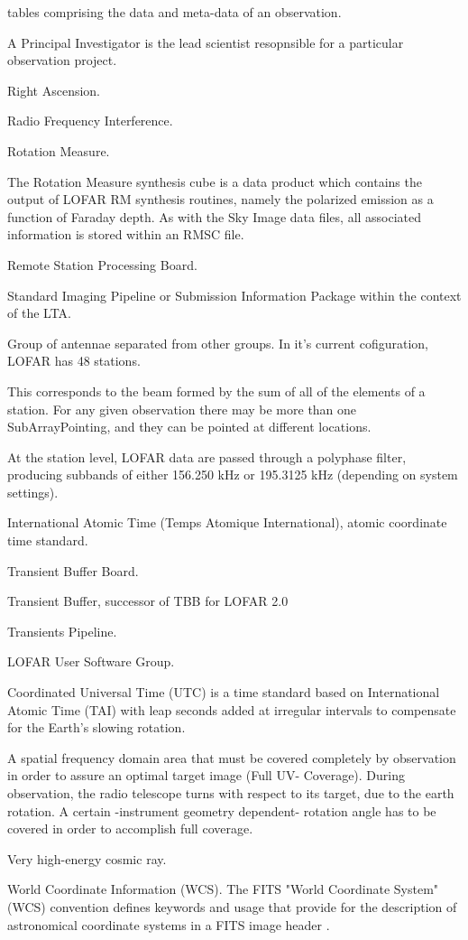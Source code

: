 \begin{description}
  tables comprising the data and meta-data of an observation. \cite{aips++.note.229}
\item[PI] A Principal Investigator is the lead scientist resopnsible for a
particular observation project.
\item[RA] Right Ascension.
\item[RFI] Radio Frequency Interference.
\item[RM] Rotation Measure.
\item[RMSC] The Rotation Measure synthesis cube is a data product which contains
the output of LOFAR RM synthesis routines, namely the polarized emission as a
function of Faraday depth.  As with the Sky Image data files, all associated
information is stored within an RMSC file.
\item[RSP] Remote Station Processing Board.
\item[SIP] Standard Imaging Pipeline or Submission Information Package within the context of the LTA.
\item[Station] Group of antennae separated from other groups. In it's current
cofiguration, LOFAR has 48 stations.
\item[SubArrayPointing] This corresponds to the beam formed by the sum of all of
the elements of a station. For any given observation there may be more
than one SubArrayPointing, and they can be pointed at different locations.
\item[Subband] At the station level, LOFAR data are passed through a polyphase
filter, producing subbands of either 156.250 kHz or 195.3125 kHz (depending on
system settings).
\item[TAI] International Atomic Time (Temps Atomique International),
  atomic coordinate time standard.
\item[TBB] Transient Buffer Board.
\item[TBuf] Transient Buffer, successor of TBB for LOFAR 2.0
\item[TRAP] Transients Pipeline.
\item[USG] LOFAR User Software Group.
\item[UTC] Coordinated Universal Time (UTC) is a time standard based
  on International Atomic Time (TAI) with leap seconds added at
  irregular intervals to compensate for the Earth's slowing rotation.
\item[UV-Coverage] A spatial frequency domain area that must be covered
completely by observation in order to assure an optimal target image (Full UV-
Coverage). During observation, the radio telescope turns with respect to its
target, due to the earth rotation. A certain -instrument geometry dependent-
rotation angle has to be covered in order to accomplish full coverage.
\item[VHECR] Very high-energy cosmic ray.
\item[WCS] World Coordinate Information (WCS). The FITS "World
  Coordinate System" (WCS) convention defines keywords and usage that
  provide for the description of astronomical coordinate systems in a
  FITS image header \cite{fits.paper1, fits.paper2, fits.paper3}.
\end{description}
